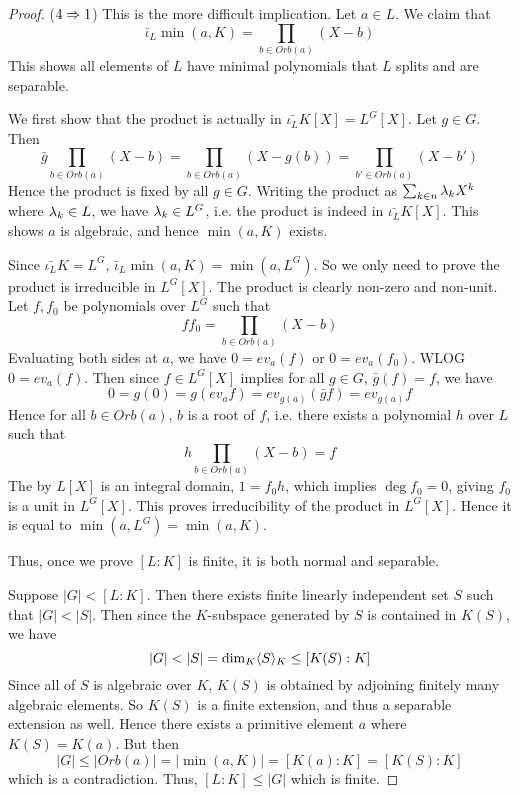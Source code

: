 \documentclass[../book.tex]{subfiles}
\begin{document}
\begin{proof}
    ($4\Rightarrow 1$)        
        This is the more difficult implication.
        Let $a \in L$. We claim that \[
        \bar\iota_L \min(a,K) = \prod_{b \in Orb(a)} (X - b)
        \]
        This shows all elements of $L$ have minimal polynomials 
        that $L$ splits and are separable. 
    
        We first show that the product is actually in $\bar{\iota_L}K[X] = L^G[X]$. 
        Let $g \in G$. Then \[
            \bar{g} \prod_{b \in Orb(a)} (X - b) 
            = \prod_{b \in Orb(a)} (X - g(b)) = \prod_{b' \in Orb(a)} (X - b')
        \]
        Hence the product is fixed by all $g \in G$. 
        Writing the product as $\sum_{k\in n} \lambda_k X^k$ where $\lambda_k \in L$,
        we have $\lambda_k \in L^G$, i.e. the product is indeed in $\bar{\iota_L}K[X]$. 
        This shows $a$ is algebraic, and hence $\min(a,K)$ exists.
        
        Since $\bar{\iota_L} K = L^G$, $\bar\iota_L \min(a,K) = \min(a,L^G)$.
        So we only need to prove the product is irreducible in $L^G[X]$.
        The product is clearly non-zero and non-unit. 
        Let $f, f_0$ be polynomials over $L^G$ such that \[
            f f_0 = \prod_{b \in Orb(a)} (X - b)
        \]
        Evaluating both sides at $a$, 
        we have $0 = ev_a (f)$ or $0 = ev_a(f_0)$. 
        WLOG $0 = ev_a (f)$. 
        Then since $f \in L^G[X]$ implies 
        for all $g \in G$, $\bar{g}(f) = f$, 
        we have \[
            0 = g(0) = g(ev_a f) = ev_{g(a)}(\bar{g} f) = ev_{g(a)} f
        \]
        Hence for all $b \in Orb(a)$, $b$ is a root of $f$, i.e.
        there exists a polynomial $h$ over $L$ such that \[
            h \prod_{b \in Orb(a)} (X - b) = f
        \]
        The by $L[X]$ is an integral domain, $1 = f_0 h$,
        which implies $\deg f_0 = 0$, giving $f_0$ is a unit in $L^G[X]$. 
        This proves irreducibility of the product in $L^G[X]$. 
        Hence it is equal to $\min(a,L^G) = \min(a,K)$. 
    
        Thus, once we prove $[L : K]$ is finite, it is both normal and separable. 
    
        Suppose $|G| < [L : K]$. 
        Then there exists finite linearly independent set $S$ such that $|G| < |S|$. 
        Then since the $K$-subspace generated by $S$ is contained in $K(S)$, 
        we have \[ |G| < |S| = \dim_{K} \langle S\rangle_{K} \leq [K(S) : K] \]
        Since all of $S$ is algebraic over $K$, 
        $K(S)$ is obtained by adjoining finitely many algebraic elements.
        So $K(S)$ is a finite extension, and thus a separable extension as well. 
        Hence there exists a primitive element $a$ where $K(S) = K(a)$. 
        But then \[
            |G| \leq |Orb(a)| = |\min(a,K)| = [K(a) : K] = [K(S) : K]
        \]
        which is a contradiction. 
        Thus, $[L : K] \leq |G|$ which is finite. 
\end{proof}
\end{document}
